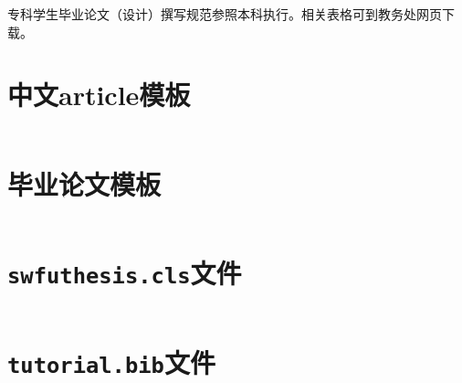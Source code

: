 \documentclass{swfuthesis}
\begin{document}
专科学生毕业论文（设计）撰写规范参照本科执行。相关表格可到教务处网页下载。



\chapter{中文article模板}
\label{app:article}

\inputminted{latex}{article.tex}

\chapter{毕业论文模板}
\label{app:thesis}

\inputminted{latex}{thesis-template.tex}

\chapter{\texttt{swfuthesis.cls}文件}
\label{app:class}

\inputminted{latex}{swfuthesis.cls}

\chapter{\texttt{tutorial.bib}文件}
\label{app:bib}

\inputminted{bibtex}{tutorial.bib}
\end{document}
